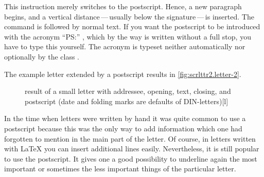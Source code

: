 \begin{Declaration}
\end{Declaration}%
%
This instruction merely switches to the postscript.  Hence, a new
paragraph begins, and a vertical distance\,---\,usually below the
signature\,---\,is inserted.  The command  is followed by
normal text. If you want the postscript to be introduced with the
acronym ``PS:'' , which by the way is written without a full stop, you
have to type this yourself. The acronym is typeset neither
automatically nor optionally by the class .

\begin{Example}
  The example letter extended by a postscript
  results in \autoref{fig:scrlttr2.letter-2}.
  \begin{figure}
    \setcapindent{0pt}%
    \begin{captionbeside}{%
        result of a small letter with addressee, opening, text, closing, and
        postscript
        (date and folding marks are defaults of DIN-letters)}[l]
    \end{captionbeside}
    \label{fig:scrlttr2.letter-2}
  \end{figure}
\end{Example}

\begin{Explain}
  In the time when letters were written by hand it was quite common to use a
  postscript because this was the only way to add information which one had
  forgotten to mention in the main part of the letter. Of course, in letters
  written with {\LaTeX} you can insert additional lines easily. Nevertheless,
  it is still popular to use the postscript. It gives one a good possibility
  to underline again the most important or sometimes the less important things
  of the particular letter.
\end{Explain}
%

